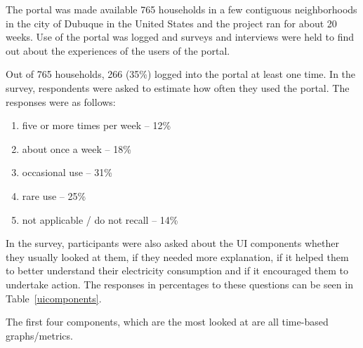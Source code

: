\documentclass[journal]{vgtc}                %
\begin{document}
The portal was made available 765 households in a few contiguous neighborhoods in the city of Dubuque in the United States and the project ran for about 20 weeks. Use of the portal was logged and surveys and interviews were held to find out about the experiences of the users of the portal.

Out of 765 households, 266 (35\%) logged into the portal at least one time. In the survey, respondents were asked to estimate how often they used the portal. The responses were as follows:
\begin{enumerate}
\item five or more times per week -- 12\%
\item about once a week -- 18\%
\item occasional use -- 31\%
\item rare use -- 25\%
\item not applicable / do not recall -- 14\%
\end{enumerate}

In the survey, participants were also asked about the UI components whether they usually looked at them, if they needed more explanation, if it helped them to better understand their electricity consumption and if it encouraged them to undertake action. The responses in percentages to these questions can be seen in Table~\ref{uicomponents}. %

The first four components, which are the most looked at are all time-based graphs/metrics. 
\end{document}
